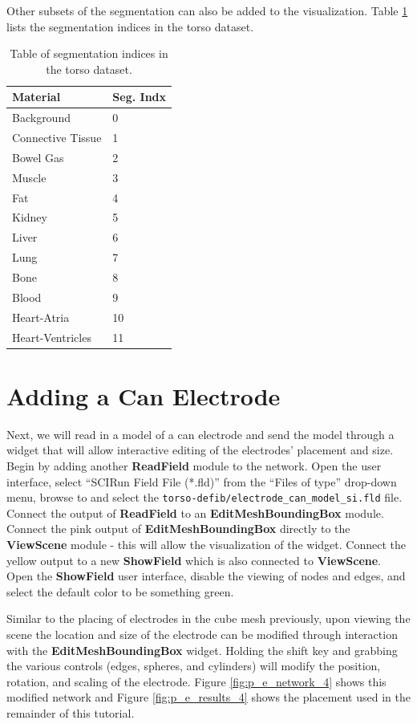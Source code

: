 \documentclass[fleqn,11pt,openany]{book}
\begin{document}
Other subsets of the segmentation can also be added to the
visualization. Table \ref{tbl:seg_values} lists the segmentation
indices in the torso dataset.

\begin{table}
\begin{tabular}{|l|l|}
\hline
{\bf Material} & {\bf Seg. Indx}\\ \hline
\hline
Background & 0\\ \hline
Connective Tissue & 1\\ \hline
Bowel Gas & 2 \\ \hline
Muscle & 3 \\ \hline
Fat & 4 \\ \hline
Kidney & 5 \\ \hline
Liver & 6 \\ \hline
Lung & 7 \\ \hline
Bone & 8 \\ \hline
Blood & 9 \\ \hline
Heart-Atria & 10 \\ \hline
Heart-Ventricles & 11 \\ \hline
\end{tabular}
\caption{Table of segmentation indices in the torso dataset.}
\label{tbl:seg_values}
\end{table}

\section{Adding a Can Electrode}

Next, we will read in a model of a can electrode and send the model
through a widget that will allow interactive editing of the
electrodes' placement and size. Begin by adding another {\bf
ReadField} module to the network. Open the user interface, select
``SCIRun Field File (*.fld)'' from the ``Files of type'' drop-down
menu, browse to and select the {\tt torso-defib/electrode\_can\_model\_si.fld}
file. Connect the output of {\bf ReadField} to an {\bf
EditMeshBoundingBox} module. Connect the pink output of {\bf
EditMeshBoundingBox} directly to the {\bf ViewScene} module - this
will allow the visualization of the widget. Connect the yellow output
to a new {\bf ShowField} which is also connected to {\bf
ViewScene}. Open the {\bf ShowField} user interface, disable the
viewing of nodes and edges, and select the default color to be
something green.

Similar to the placing of electrodes in the cube mesh previously, upon
viewing the scene the location and size of the electrode can be
modified through interaction with the {\bf EditMeshBoundingBox}
widget. Holding the shift key and grabbing the various controls
(edges, spheres, and cylinders) will modify the position, rotation,
and scaling of the electrode. Figure \ref{fig:p_e_network_4} shows
this modified network and Figure \ref{fig:p_e_results_4} shows the
placement used in the remainder of this tutorial.
\end{document}
